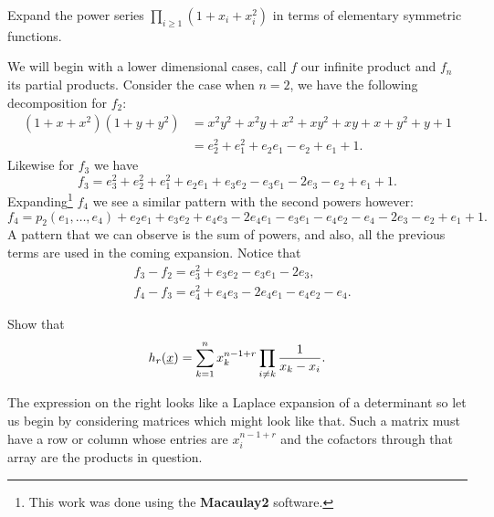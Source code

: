 \documentclass[12pt]{memoir}
\begin{document}
\begin{Ej}
    Expand the power series $\prod_{i\geq 1}(1+x_i+x_i^2)$ in terms of elementary symmetric functions.
   \end{Ej}
\begin{ptcbr}
We will begin with a lower dimensional cases, call $f$ our infinite product and $f_n$ its partial products. Consider the case when $n=2$, we have the following decomposition for $f_2$:
\begin{align*}
    (1+x+x^2)(1+y+y^2)&=x^2 y^2 + x^2 y + x^2 + x y^2 + x y + x + y^2 + y + 1\\
    &=e_2^2+e_1^2+e_2e_1-e_2+e_1+1.
\end{align*}
Likewise for $f_3$ we have 
$$f_3=e_3^2+e_2^2+e_1^2+e_2e_1+e_3e_2-e_3e_1-2e_3-e_2+e_1+1.$$
Expanding\footnote{This work was done using the \textbf{Macaulay2} software.} $f_4$ we see a similar pattern with the second powers however:
$$f_4=p_2(e_1,\dots,e_4)+e_2e_1+e_3e_2+e_4e_3-2e_4e_1-e_3e_1-e_4e_2-e_4-2e_3-e_2+e_1+1.$$
A pattern that we can observe is the sum of powers, and also, all the previous terms are used in the coming expansion. Notice that 
\begin{align*}
&f_3-f_2=e_3^2+e_3e_2-e_3e_1-2e_3,\\
&f_4-f_3=e_4^2+e_4e_3-2e_4e_1-e_4e_2-e_4.    
\end{align*}

\end{ptcbr}

\begin{Ej}
    Show that 
    $$h_r(\underline x)=\sum_{k=1}^nx_k^{n-1+r}\prod_{i\neq k}\frac{1}{x_k-x_i}.$$
\end{Ej}

\begin{ptcbr}
    The expression on the right looks like a Laplace expansion of a determinant so let us begin by considering matrices which might look like that. Such a matrix must have a row or column whose entries are $x_i^{n-1+r}$ and the cofactors through that array are the products in question.
\end{ptcbr}
\end{document}

